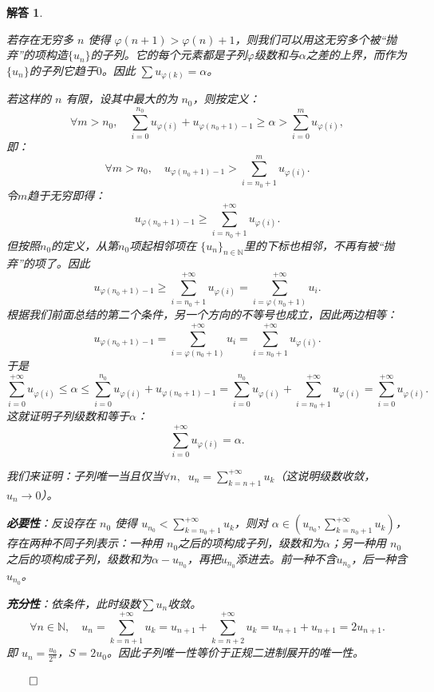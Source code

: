 \documentclass[12pt,UTF8,fontset=none]{ctexbook}
\theoremstyle{exercisestyle}
\theoremstyle{solutionstyle}
\newtheorem*{solution*}{解答}
\newenvironment{solution}
  {\begin{solution*}}
  {\hfill\ensuremath{\qed}\end{solution*}}
\begin{document}
\begin{solution}
\begin{subquestions}
若存在无穷多 $n$ 使得 $\varphi(n+1) > \varphi(n)+1$，则我们可以用这无穷多个被“抛弃”的项构造$\{u_n\}$的子列。它的每个元素都是子列$\varphi$级数和与$\alpha$之差的上界，而作为$\{u_n\}$的子列它趋于$0$。因此 $\sum u_{\varphi(k)} = \alpha$。

若这样的 $n$ 有限，设其中最大的为 $n_0$，则按定义：
$$ \forall m > n_0, \quad \sum_{i=0}^{n_0} u_{\varphi(i)} + u_{\varphi(n_0+1) - 1} \geqslant \alpha > \sum_{i=0}^{m} u_{\varphi(i)} ,$$
即：
$$
\forall m > n_0, \quad u_{\varphi(n_0+1) - 1} > \sum_{i=n_0+1}^{m} u_{\varphi(i)}.
$$
令$m$趋于无穷即得：
$$
u_{\varphi(n_0+1) - 1} \geqslant \sum_{i=n_0+1}^{+\infty} u_{\varphi(i)}.
$$
但按照$n_0$的定义，从第$n_0$项起相邻项在 $\{u_n\}_{n\in\mathbb{N}}$里的下标也相邻，不再有被“抛弃”的项了。因此
$$
u_{\varphi(n_0+1) - 1} \geqslant \sum_{i=n_0+1}^{+\infty} u_{\varphi(i)} = \sum_{i=\varphi(n_0+1)}^{+\infty} u_{i}.
$$
根据我们前面总结的第二个条件，另一个方向的不等号也成立，因此两边相等：
$$
u_{\varphi(n_0+1) - 1} = \sum_{i=\varphi(n_0+1)}^{+\infty} u_{i} = \sum_{i=n_0+1}^{+\infty} u_{\varphi(i)}.
$$
于是
$$
\sum_{i=0}^{+\infty} u_{\varphi(i)}\leqslant \alpha \leqslant \sum_{i=0}^{n_0} u_{\varphi(i)} + u_{\varphi(n_0+1) - 1} = \sum_{i=0}^{n_0} u_{\varphi(i)} + \sum_{i=n_0+1}^{+\infty} u_{\varphi(i)} = \sum_{i=0}^{+\infty} u_{\varphi(i)}.
$$
这就证明子列级数和等于$\alpha$：
$$
\sum_{i=0}^{+\infty} u_{\varphi(i)} = \alpha.
$$

\item 我们来证明：子列唯一当且仅当$\forall n, \;\;\displaystyle u_n = \sum_{k=n+1}^{+\infty} u_k$（这说明级数收敛， $u_n \to 0$）。

\textbf{必要性}：反设存在 $n_0$ 使得 $u_{n_0} < \sum_{k=n_0+1}^{+\infty} u_k$，则对 $\alpha \in \left( u_{n_0}, \sum_{k=n_0+1}^{+\infty} u_k \right)$，存在两种不同子列表示：一种用 $n_0$之后的项构成子列，级数和为$\alpha $；另一种用 $n_0$之后的项构成子列，级数和为$\alpha - u_{n_0}$，再把$u_{n_0}$添进去。前一种不含$u_{n_0}$，后一种含$u_{n_0}$。

\textbf{充分性}：依条件，此时级数$\sum u_n$收敛。 
$$
\forall n\in \mathbb{N},\quad u_n = \sum_{k=n+1}^{+\infty} u_k = u_{n+1} + \sum_{k=n+2}^{+\infty} u_k = u_{n+1} + u_{n+1} = 2u_{n+1}.
$$
即 $\displaystyle u_n = \frac{u_0}{2^n}$，$S = 2u_0$。因此子列唯一性等价于正规二进制展开的唯一性。
\end{subquestions}
\end{solution}
\end{document}
